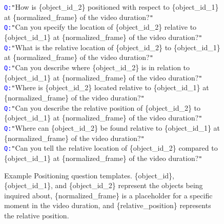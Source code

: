 \begin{figure*}[hbtp]
\begin{tcolorbox}[colback=gray!10,%
	colframe=black,%
	width=\textwidth,
	arc=1mm, auto outer arc,
	boxrule=0.5pt,
	]
           \texttt{\textcolor{blue}{Q:}}\texttt{"}How is \mbox{\{object\_id\_2\}} positioned with respect to \mbox{\{object\_id\_1\}} at \mbox{\{normalized\_frame\}} of the video duration?\texttt{"}\\
        \texttt{\textcolor{blue}{Q:}}\texttt{"}Can you specify the location of \mbox{\{object\_id\_2\}} relative to \mbox{\{object\_id\_1\}} at \mbox{\{normalized\_frame\}} of the video duration?\texttt{"}\\
        \texttt{\textcolor{blue}{Q:}}\texttt{"}What is the relative location of \mbox{\{object\_id\_2\}} to \mbox{\{object\_id\_1\}} at \mbox{\{normalized\_frame\}} of the video duration?\texttt{"}\\
        \texttt{\textcolor{blue}{Q:}}\texttt{"}Can you describe where \mbox{\{object\_id\_2\}} is in relation to \mbox{\{object\_id\_1\}} at \mbox{\{normalized\_frame\}} of the video duration?\texttt{"}\\
        \texttt{\textcolor{blue}{Q:}}\texttt{"}Where is \mbox{\{object\_id\_2\}} located relative to \mbox{\{object\_id\_1\}} at \mbox{\{normalized\_frame\}} of the video duration?\texttt{"}\\
        \texttt{\textcolor{blue}{Q:}}\texttt{"}Can you describe the relative position of \mbox{\{object\_id\_2\}} to \mbox{\{object\_id\_1\}} at \mbox{\{normalized\_frame\}} of the video duration?\texttt{"}\\
        \texttt{\textcolor{blue}{Q:}}\texttt{"}Where can \mbox{\{object\_id\_2\}} be found relative to \mbox{\{object\_id\_1\}} at \mbox{\{normalized\_frame\}} of the video duration?\texttt{"}\\
        \texttt{\textcolor{blue}{Q:}}\texttt{"}Can you tell the relative location of \mbox{\{object\_id\_2\}} compared to \mbox{\{object\_id\_1\}} at \mbox{\{normalized\_frame\}} of the video duration?\texttt{"}\\

\end{tcolorbox}
\caption{Example Positioning question templates. \mbox{\{object\_id\}}, \mbox{\{object\_id\_1\}}, and \mbox{\{object\_id\_2\}} represent the objects being inquired about, \mbox{\{normalized\_frame\}} is a placeholder for a specific moment in the video duration, and \mbox{\{relative\_position\}} represents the relative position.}
\label{fig:positioning_qa_templates}
\end{figure*}



